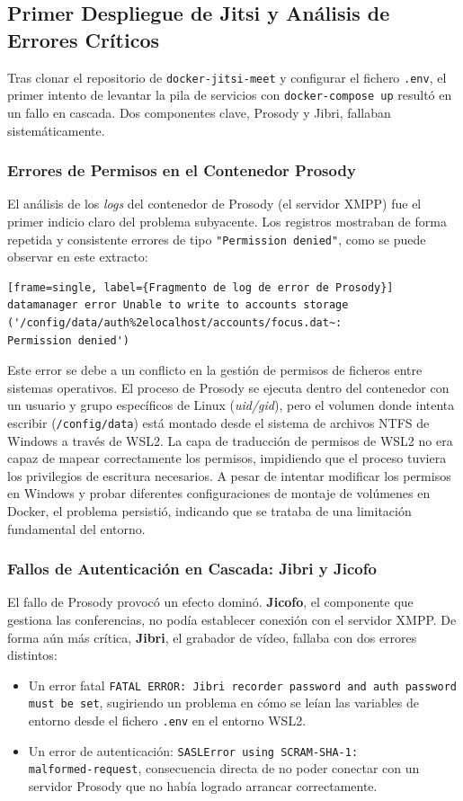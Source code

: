 \subsection{Primer Despliegue de Jitsi y Análisis de Errores Críticos}
Tras clonar el repositorio de \texttt{docker-jitsi-meet} y configurar el fichero \texttt{.env}, el primer intento de levantar la pila de servicios con \texttt{docker-compose up} resultó en un fallo en cascada. Dos componentes clave, Prosody y Jibri, fallaban sistemáticamente.

\subsubsection{Errores de Permisos en el Contenedor Prosody}
El análisis de los \textit{logs} del contenedor de Prosody (el servidor XMPP) fue el primer indicio claro del problema subyacente. Los registros mostraban de forma repetida y consistente errores de tipo \texttt{"Permission denied"}, como se puede observar en este extracto:
\begin{verbatim}[frame=single, label={Fragmento de log de error de Prosody}]
datamanager error Unable to write to accounts storage 
('/config/data/auth%2elocalhost/accounts/focus.dat~:
Permission denied')
\end{verbatim}
Este error se debe a un conflicto en la gestión de permisos de ficheros entre sistemas operativos. El proceso de Prosody se ejecuta dentro del contenedor con un usuario y grupo específicos de Linux (\textit{uid/gid}), pero el volumen donde intenta escribir (\texttt{/config/data}) está montado desde el sistema de archivos NTFS de Windows a través de WSL2. La capa de traducción de permisos de WSL2 no era capaz de mapear correctamente los permisos, impidiendo que el proceso tuviera los privilegios de escritura necesarios. A pesar de intentar modificar los permisos en Windows y probar diferentes configuraciones de montaje de volúmenes en Docker, el problema persistió, indicando que se trataba de una limitación fundamental del entorno.

\subsubsection{Fallos de Autenticación en Cascada: Jibri y Jicofo}
El fallo de Prosody provocó un efecto dominó. \textbf{Jicofo}, el componente que gestiona las conferencias, no podía establecer conexión con el servidor XMPP. De forma aún más crítica, \textbf{Jibri}, el grabador de vídeo, fallaba con dos errores distintos:
\begin{itemize}
    \item Un error fatal \texttt{FATAL ERROR: Jibri recorder password and auth password must be set}, sugiriendo un problema en cómo se leían las variables de entorno desde el fichero \texttt{.env} en el entorno WSL2.
    \item Un error de autenticación: \texttt{SASLError using SCRAM-SHA-1:} \\
    \texttt{malformed-request}, consecuencia directa de no poder conectar con un servidor Prosody que no había logrado arrancar correctamente.
\end{itemize}

